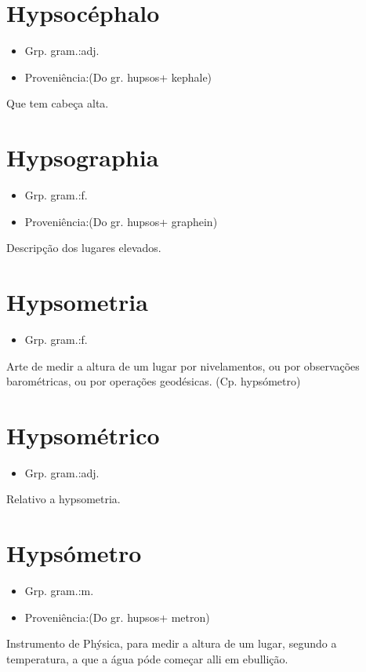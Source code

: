 \documentclass{article}
\begin{document}
\section{Hypsocéphalo}
\begin{itemize}
\item {Grp. gram.:adj.}
\end{itemize}
\begin{itemize}
\item {Proveniência:(Do gr. \textunderscore hupsos\textunderscore  + \textunderscore kephale\textunderscore )}
\end{itemize}
Que tem cabeça alta.
\section{Hypsographia}
\begin{itemize}
\item {Grp. gram.:f.}
\end{itemize}
\begin{itemize}
\item {Proveniência:(Do gr. \textunderscore hupsos\textunderscore  + \textunderscore graphein\textunderscore )}
\end{itemize}
Descripção dos lugares elevados.
\section{Hypsometria}
\begin{itemize}
\item {Grp. gram.:f.}
\end{itemize}
Arte de medir a altura de um lugar por nivelamentos, ou por observações barométricas, ou por operações geodésicas.
(Cp. \textunderscore hypsómetro\textunderscore )
\section{Hypsométrico}
\begin{itemize}
\item {Grp. gram.:adj.}
\end{itemize}
Relativo a hypsometria.
\section{Hypsómetro}
\begin{itemize}
\item {Grp. gram.:m.}
\end{itemize}
\begin{itemize}
\item {Proveniência:(Do gr. \textunderscore hupsos\textunderscore  + \textunderscore metron\textunderscore )}
\end{itemize}
Instrumento de Phýsica, para medir a altura de um lugar, segundo a temperatura, a que a água póde começar alli em ebullição.
\end{document}
